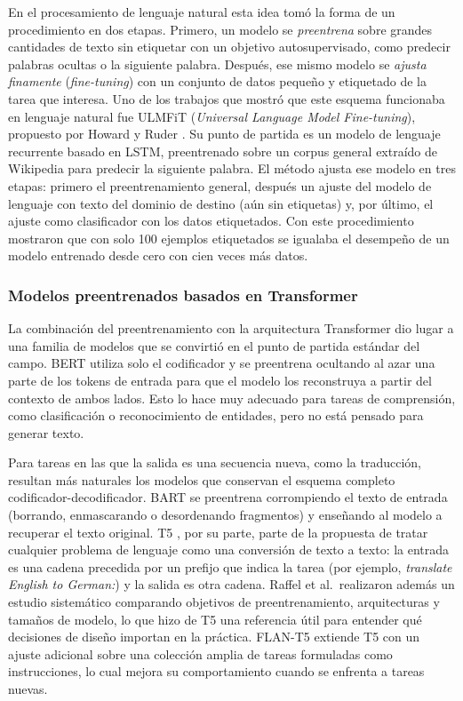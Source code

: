 En el procesamiento de lenguaje natural esta idea tomó la forma de un procedimiento en dos etapas. Primero, un modelo se \textit{preentrena} sobre grandes cantidades de texto sin etiquetar con un objetivo autosupervisado, como predecir palabras ocultas o la siguiente palabra. Después, ese mismo modelo se \textit{ajusta finamente} (\textit{fine-tuning}) con un conjunto de datos pequeño y etiquetado de la tarea que interesa. Uno de los trabajos que mostró que este esquema funcionaba en lenguaje natural fue ULMFiT (\textit{Universal Language Model Fine-tuning}), propuesto por Howard y Ruder \cite{howard2018ulmfit}. Su punto de partida es un modelo de lenguaje recurrente basado en LSTM, preentrenado sobre un corpus general extraído de Wikipedia para predecir la siguiente palabra. El método ajusta ese modelo en tres etapas: primero el preentrenamiento general, después un ajuste del modelo de lenguaje con texto del dominio de destino (aún sin etiquetas) y, por último, el ajuste como clasificador con los datos etiquetados. Con este procedimiento mostraron que con solo 100 ejemplos etiquetados se igualaba el desempeño de un modelo entrenado desde cero con cien veces más datos.


\subsubsection{Modelos preentrenados basados en Transformer}


La combinación del preentrenamiento con la arquitectura Transformer dio lugar a una familia de modelos que se convirtió en el punto de partida estándar del campo. BERT \cite{devlin2019bert} utiliza solo el codificador y se preentrena ocultando al azar una parte de los tokens de entrada para que el modelo los reconstruya a partir del contexto de ambos lados. Esto lo hace muy adecuado para tareas de comprensión, como clasificación o reconocimiento de entidades, pero no está pensado para generar texto.

Para tareas en las que la salida es una secuencia nueva, como la traducción, resultan más naturales los modelos que conservan el esquema completo codificador-decodificador. BART \cite{lewis2020bart} se preentrena corrompiendo el texto de entrada (borrando, enmascarando o desordenando fragmentos) y enseñando al modelo a recuperar el texto original. T5 \cite{raffel2020t5}, por su parte, parte de la propuesta de tratar cualquier problema de lenguaje como una conversión de texto a texto: la entrada es una cadena precedida por un prefijo que indica la tarea (por ejemplo, \textit{translate English to German:}) y la salida es otra cadena. Raffel et al.\ realizaron además un estudio sistemático comparando objetivos de preentrenamiento, arquitecturas y tamaños de modelo, lo que hizo de T5 una referencia útil para entender qué decisiones de diseño importan en la práctica. FLAN-T5 \cite{chung2022flan} extiende T5 con un ajuste adicional sobre una colección amplia de tareas formuladas como instrucciones, lo cual mejora su comportamiento cuando se enfrenta a tareas nuevas.

